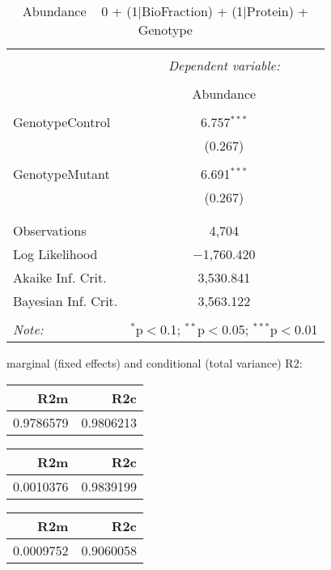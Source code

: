 \documentclass[11pt]{report}
\begin{document}
\begin{table}[!htbp] \centering 
  \caption{Abundance ~ 0 + (1|BioFraction) + (1|Protein) + Genotype} 
  \label{} 
\begin{tabular}{@{\extracolsep{5pt}}lc} 
\\[-1.8ex]\hline 
\hline \\[-1.8ex] 
 & \multicolumn{1}{c}{\textit{Dependent variable:}} \\ 
\cline{2-2} 
\\[-1.8ex] & Abundance \\ 
\hline \\[-1.8ex] 
 GenotypeControl & 6.757$^{***}$ \\ 
  & (0.267) \\ 
  & \\ 
 GenotypeMutant & 6.691$^{***}$ \\ 
  & (0.267) \\ 
  & \\ 
\hline \\[-1.8ex] 
Observations & 4,704 \\ 
Log Likelihood & $-$1,760.420 \\ 
Akaike Inf. Crit. & 3,530.841 \\ 
Bayesian Inf. Crit. & 3,563.122 \\ 
\hline 
\hline \\[-1.8ex] 
\textit{Note:}  & \multicolumn{1}{r}{$^{*}$p$<$0.1; $^{**}$p$<$0.05; $^{***}$p$<$0.01} \\ 
\end{tabular} 
\end{table} 
marginal (fixed effects) and conditional (total variance) R2:

\begin{tabular}{r|r}
\hline
R2m & R2c\\
\hline
0.9786579 & 0.9806213\\
\hline
\end{tabular}

\begin{tabular}{r|r}
\hline
R2m & R2c\\
\hline
0.0010376 & 0.9839199\\
\hline
\end{tabular}

\begin{tabular}{r|r}
\hline
R2m & R2c\\
\hline
0.0009752 & 0.9060058\\
\hline
\end{tabular}
\end{document}
